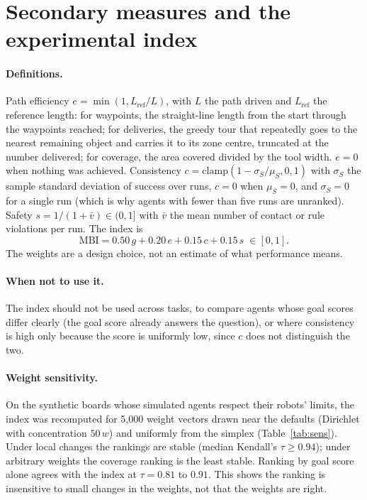 \documentclass[11pt]{article}
\begin{document}
\section{Secondary measures and the experimental index}\label{app:index}

\paragraph{Definitions.} Path efficiency $e=\min(1, L_{\text{ref}}/L)$, with $L$ the path driven and
$L_{\text{ref}}$ the reference length: for waypoints, the straight-line length from the start through
the waypoints reached; for deliveries, the greedy tour that repeatedly goes to the nearest remaining
object and carries it to its zone centre, truncated at the number delivered; for coverage, the area
covered divided by the tool width. $e=0$ when nothing was achieved. Consistency
$c=\mathrm{clamp}(1-\sigma_S/\mu_S,0,1)$ with $\sigma_S$ the sample standard deviation of success over
runs, $c=0$ when $\mu_S=0$, and $\sigma_S=0$ for a single run (which is why agents with fewer than five
runs are unranked). Safety $s=1/(1+\bar v)\in(0,1]$ with $\bar v$ the mean number of contact or rule
violations per run. The index is
\[\mathrm{MBI}=0.50\,g+0.20\,e+0.15\,c+0.15\,s\;\in[0,1].\]
The weights are a design choice, not an estimate of what performance means.

\paragraph{When not to use it.} The index should not be used across tasks, to compare agents whose
goal scores differ clearly (the goal score already answers the question), or where consistency is
high only because the score is uniformly low, since $c$ does not distinguish the two.

\paragraph{Weight sensitivity.} On the synthetic boards whose simulated agents respect their robots'
limits, the index was recomputed for 5{,}000 weight vectors drawn near the defaults (Dirichlet with
concentration $50\,w$) and uniformly from the simplex (Table~\ref{tab:sens}). Under local changes the
rankings are stable (median Kendall's $\tau\ge0.94$); under arbitrary weights the coverage ranking is
the least stable. Ranking by goal score alone agrees with the index at $\tau=0.81$ to $0.91$. This
shows the ranking is insensitive to small changes in the weights, not that the weights are right.
\end{document}
